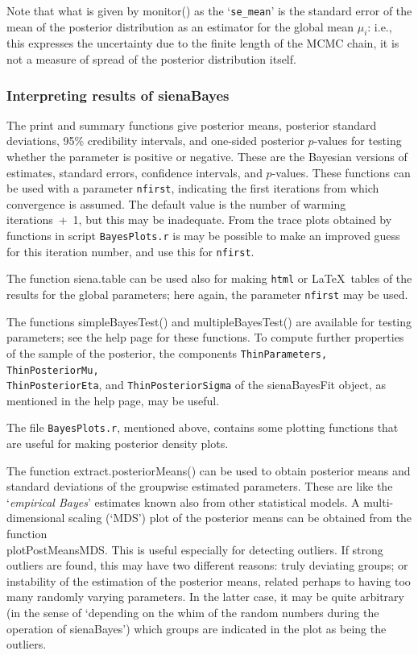 \documentclass[a4paper,fleqn,11pt]{article}
\newcommand{\+}{\, + \,}
\newcommand{\sfn}[1]{\textsf{#1}}
\begin{document}
Note that what is given by \sfn{monitor()} as the
`\texttt{se\_mean}' is the standard error of the mean
of the posterior distribution as an estimator for
the global mean $\mu_i$: i.e., this expresses the uncertainty
due to the finite length of the MCMC chain, it is not
a measure of spread of the posterior distribution itself.


\subsubsection{Interpreting results of sienaBayes}
\label{S_sienaBayesInterpret}

The \sfn{print} and \sfn{summary} functions
give posterior means, posterior standard deviations, 95\% credibility intervals,
and one-sided posterior $p$-values
for testing whether the parameter is positive or negative.
These are the Bayesian versions of estimates, standard errors,
confidence intervals, and $p$-values.
These functions can be used with a parameter \texttt{nfirst}, indicating
the first iterations from which convergence is assumed.
The default value is the number of warming iterations~+~1,
but this may be inadequate. From the trace plots obtained by
functions in script  \texttt{BayesPlots.r} is may be possible
to make an improved guess for this iteration number,
and use this for \texttt{nfirst}.

The function \sfn{siena.table} can be used also for making
\texttt{html} or \LaTeX\ tables of the results for the global parameters;
here again, the parameter \texttt{nfirst} may be used.

The functions \sfn{simpleBayesTest()} and \sfn{multipleBayesTest()}
are available for testing parameters; see the help page for these functions.
To compute further properties of the sample of the posterior,
the components
\texttt{ThinParameters, ThinPosteriorMu, \\
ThinPosteriorEta}, and \texttt{ThinPosteriorSigma} of the
\sfn{sienaBayesFit} object, as mentioned in the help page, may be useful.

The file \texttt{BayesPlots.r}, mentioned above, contains some plotting
functions that are useful for making posterior density plots.

The function \sfn{extract.posteriorMeans()} can be used to obtain
posterior means and standard deviations of the groupwise estimated
parameters. These are like the `\emph{empirical Bayes}' estimates
known also from other statistical models.
A multi-dimensional scaling (`MDS') plot of the posterior means
can be obtained from the function \\
\sfn{plotPostMeansMDS}.
This is useful especially for detecting outliers.
If strong outliers are found, this may have two different reasons:
truly deviating groups; or instability of the estimation
of the posterior means, related perhaps to having too many
randomly varying parameters.
In the latter case, it may be quite arbitrary (in the sense of
`depending on the whim of the random numbers during the
operation of \sfn{sienaBayes}') which groups are
indicated in the plot as being the outliers.
\end{document}
